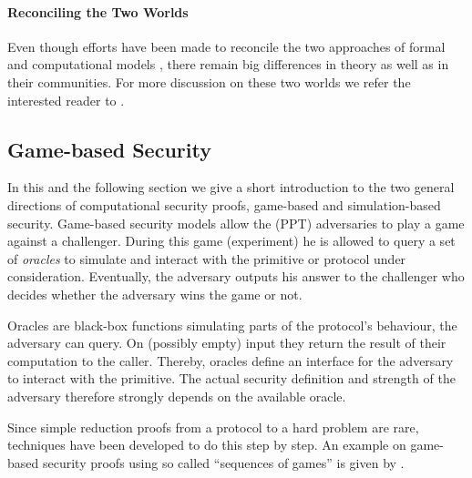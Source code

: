 \paragraph{Reconciling the Two Worlds}
Even though efforts have been made to reconcile the two approaches of formal and computational models \cite{Abadi2002,Herzog2005}, there remain big differences in theory as well as in their communities.
For more discussion on these two worlds we refer the interested reader to \citet{cortier2011survey}.

\subsection{Game-based Security}
In this and the following section we give a short introduction to the two general directions of computational security proofs, game-based and simulation-based security.
Game-based security models allow the (\ac{PPT}) adversaries to play a game against a challenger.
During this game (\aka experiment) he is allowed to query a set of \emph{oracles} to simulate and interact with the primitive or protocol under consideration.
Eventually, the adversary outputs his answer to the challenger who decides whether the adversary wins the game or not.

Oracles are black-box functions simulating parts of the protocol's behaviour, the adversary can query.
On (possibly empty) input they return the result of their computation to the caller.
Thereby, oracles define an interface for the adversary to interact with the primitive.
The actual security definition and strength of the adversary therefore strongly depends on the available oracle.

Since simple reduction proofs from a protocol to a hard problem are rare, techniques have been developed to do this step by step.
An example on game-based security proofs using so called ``sequences of games'' is given by \citet{Shoup2004}.


